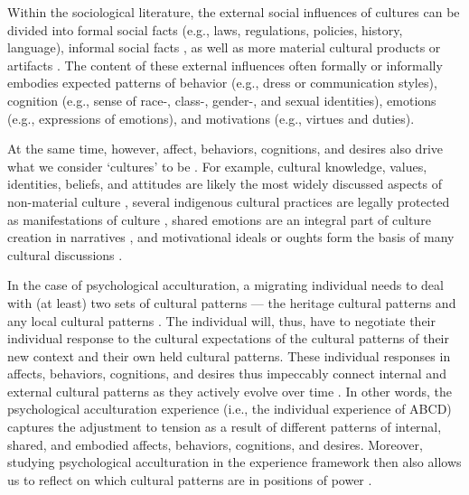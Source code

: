 \documentclass[man, 12pt, a4paper, mask]{apa7}
\begin{document}
Within the sociological literature, the external social influences of cultures can be divided into formal social facts (e.g., laws, regulations, policies, history, language), informal social facts \citep[e.g., norms, values, beliefs, rituals, customs; also see][]{Herzog2018}, as well as more material cultural products or artifacts \citep[e.g., food, fashion, architecture, or arts, such as film, music, literature, and fine arts; e.g., see][]{Alexander2001}. The content of these external influences often formally or informally embodies expected patterns of behavior (e.g., dress or communication styles), cognition (e.g., sense of race-, class-, gender-, and sexual identities), emotions (e.g., expressions of emotions), and motivations (e.g., virtues and duties).

At the same time, however, affect, behaviors, cognitions, and desires also drive what we consider `cultures' to be \citep[e.g.,][]{Varnum2017}. For example, cultural knowledge, values, identities, beliefs, and attitudes are likely the most widely discussed aspects of non-material culture \citep[i.e., cognitions; e.g.,][]{DiMaggio1997}, several indigenous cultural practices are legally protected as manifestations of culture \citep[i.e., behaviors; e.g., Art. 11]{UnitedNations2007}, shared emotions are an integral part of culture creation in narratives \citep[i.e., affects; e.g.,][]{Ahmed2014, Kitayama1994, Smith2016c, Sundararajan2015}, and motivational ideals or oughts form the basis of many cultural discussions \citep[i.e., desires; e.g., see][]{Markus1991}.

In the case of psychological acculturation, a migrating individual needs to deal with (at least) two sets of cultural patterns --- the heritage cultural patterns and any local cultural patterns \citep[e.g., see][]{Ferguson2015}. The individual will, thus, have to negotiate their individual response to the cultural expectations of the cultural patterns of their new context and their own held cultural patterns. These individual responses in affects, behaviors, cognitions, and desires thus impeccably connect internal and external cultural patterns as they actively evolve over time \citep[also see the psychological foundations of culture, in][]{adams2004}. In other words, the psychological acculturation experience (i.e., the individual experience of ABCD) captures the adjustment to tension as a result of different patterns of internal, shared, and embodied affects, behaviors, cognitions, and desires. Moreover, studying psychological acculturation in the experience framework then also allows us to reflect on which cultural patterns are in positions of power \citep{Bhatia2001}.
\end{document}
